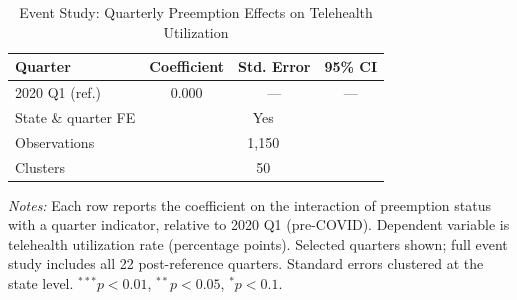 \begin{table}[htbp]
\centering
\begin{threeparttable}
\caption{Event Study: Quarterly Preemption Effects on Telehealth Utilization}
\label{tab:event}
\begin{tabular}{lccc}
\toprule
Quarter & Coefficient & Std. Error & 95\% CI \\
\midrule
2020 Q1 (ref.) & 0.000 & --- & --- \\
\midrule
State \& quarter FE & \multicolumn{3}{c}{Yes} \\
Observations & \multicolumn{3}{c}{1,150} \\
Clusters & \multicolumn{3}{c}{50} \\
\bottomrule
\end{tabular}
\begin{tablenotes}[flushleft]\footnotesize
\item \textit{Notes:} Each row reports the coefficient on the interaction of preemption status with a quarter indicator, relative to 2020 Q1 (pre-COVID). Dependent variable is telehealth utilization rate (percentage points). Selected quarters shown; full event study includes all 22 post-reference quarters. Standard errors clustered at the state level. $^{***}p<0.01$, $^{**}p<0.05$, $^{*}p<0.1$.
\end{tablenotes}
\end{threeparttable}
\end{table}

